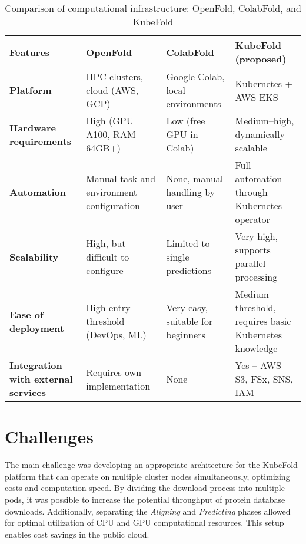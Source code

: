 \begin{table}[H]
    \centering
    \small
    \begin{tabularx}{\textwidth}{|X|X|X|X|}
        \hline
        \textbf{Features}                           & \textbf{OpenFold}                         & \textbf{ColabFold}                & \textbf{KubeFold (proposed)}                          \\
        \hline
        \textbf{Platform}                           & HPC clusters, cloud (AWS, GCP)            & Google Colab, local environments & Kubernetes + AWS EKS \\
        \hline
        \textbf{Hardware requirements}              & High (GPU A100, RAM 64GB+)                & Low (free GPU in Colab) & Medium--high, dynamically scalable \\
        \hline
        \textbf{Automation}                         & Manual task and environment configuration & None, manual handling by user & Full automation through Kubernetes operator \\
        \hline
        \textbf{Scalability}                        & High, but difficult to configure          & Limited to single predictions & Very high, supports parallel processing \\
        \hline
        \textbf{Ease of deployment}                 & High entry threshold (DevOps, ML)         & Very easy, suitable for beginners & Medium threshold, requires basic Kubernetes knowledge \\
        \hline
        \textbf{Integration with external services} & Requires own implementation               & None                              & Yes – AWS S3, FSx, SNS, IAM                           \\
        \hline
    \end{tabularx}
    \caption{Comparison of computational infrastructure: OpenFold, ColabFold, and KubeFold}
    \label{tab:comparison}
\end{table}

\section{Challenges}

The main challenge was developing an appropriate architecture for the KubeFold platform that can operate on multiple cluster nodes simultaneously, optimizing costs and computation speed.
By dividing the download process into multiple pods, it was possible to increase the potential throughput of protein database downloads.
Additionally, separating the \textit{Aligning} and \textit{Predicting} phases allowed for optimal utilization of CPU and GPU computational resources.
This setup enables cost savings in the public cloud.

